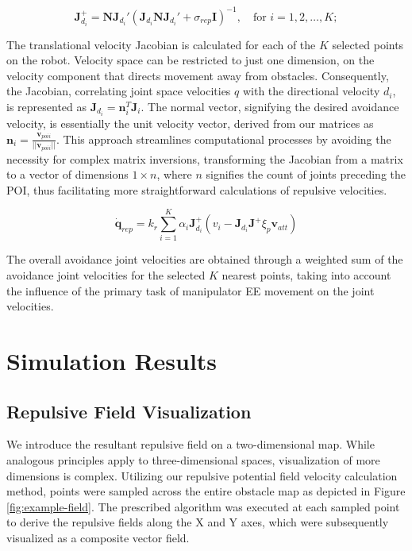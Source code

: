 \documentclass[letterpaper, 10 pt, conference]{ieeeconf}  %
\begin{document}
\begin{equation}
	\mathbf{J}_{d_i}^{+} = \mathbf{N} \mathbf{J}_{d_i}' (\mathbf{J}_{d_i} \mathbf{N} \mathbf{J}_{d_i}' + \sigma_{rep} \mathbf{I})^{-1}, \quad \text{for } i = 1, 2, \ldots, K;
	\label{eq:point_nullspace}
\end{equation}

The translational velocity Jacobian is calculated for each of the $K$ selected points on the robot. Velocity space can be restricted to just one dimension, on the velocity component that directs movement away from obstacles. Consequently, the Jacobian, correlating joint space velocities \(q\) with the directional velocity \(d_i\), is represented as \(\mathbf{J}_{d_i} = \mathbf{n}_i^T \mathbf{J}_i\). The normal vector, signifying the desired avoidance velocity, is essentially the unit velocity vector, derived from our matrices as \(\mathbf{n}_{i} = \frac{\mathbf{v}_{poi i}}{||\mathbf{v}_{poi i}||}\). This approach streamlines computational processes by avoiding the necessity for complex matrix inversions, transforming the Jacobian from a matrix to a vector of dimensions \(1 \times n\), where \(n\) signifies the count of joints preceding the POI, thus facilitating more straightforward calculations of repulsive velocities.

\begin{equation}
	\dot{\mathbf{q}}_{rep} = k_r \sum_{i=1}^{K} \alpha_i \mathbf{J}_{d_i}^{+} \left(v_i - \mathbf{J}_{d_i} \mathbf{J}^{+} \xi_{p} \mathbf{v}_{att}\right)
\end{equation}

The overall avoidance joint velocities are obtained through a weighted sum of the avoidance joint velocities for the selected \(K\) nearest points, taking into account the influence of the primary task of manipulator EE movement on the joint velocities.


\section{Simulation Results}

\subsection{Repulsive Field Visualization}

We introduce the resultant repulsive field on a two-dimensional map. While analogous principles apply to three-dimensional spaces, visualization of more dimensions is complex. Utilizing our repulsive potential field velocity calculation method, points were sampled across the entire obstacle map as depicted in Figure \ref{fig:example-field}. The prescribed algorithm was executed at each sampled point to derive the repulsive fields along the X and Y axes, which were subsequently visualized as a composite vector field.
\end{document}
